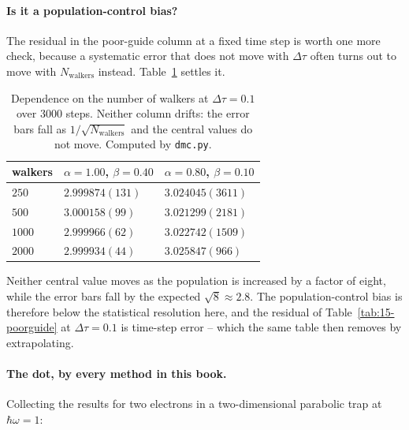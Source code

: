 \paragraph{Is it a population-control bias?}
The residual in the poor-guide column at a fixed time step is worth one more
check, because a systematic error that does not move with $\Delta\tau$ often
turns out to move with $N_{\mathrm{walkers}}$ instead.
Table~\ref{tab:15-population} settles it.

\begin{table}[h]
\centering
\renewcommand{\arraystretch}{1.2}
\setlength{\tabcolsep}{16pt}
\begin{tabular}{lll}
\toprule
walkers & $\alpha=1.00$, $\beta=0.40$ & $\alpha=0.80$, $\beta=0.10$\\
\midrule
$250$ & $2.999874(131)$ & $3.024045(3611)$\\
$500$ & $3.000158(99)$ & $3.021299(2181)$\\
$1000$ & $2.999966(62)$ & $3.022742(1509)$\\
$2000$ & $2.999934(44)$ & $3.025847(966)$\\
\bottomrule
\end{tabular}
\caption{Dependence on the number of walkers at $\Delta\tau=0.1$ over $3000$
steps.  Neither column drifts: the error bars fall as
$1/\sqrt{N_{\mathrm{walkers}}}$ and the central values do not move.  Computed
by \texttt{dmc.py}.}
\label{tab:15-population}
\end{table}

Neither central value moves as the population is increased by a factor of
eight, while the error bars fall by the expected $\sqrt{8}\approx2.8$.  The
population-control bias is therefore below the statistical resolution here,
and the residual of Table~\ref{tab:15-poorguide} at $\Delta\tau=0.1$ is
time-step error -- which the same table then removes by extrapolating.

\paragraph{The dot, by every method in this book.}
Collecting the results for two electrons in a two-dimensional parabolic trap
at $\hbar\omega=1$:

